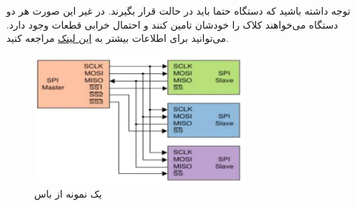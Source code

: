 توجه داشته باشید که دستگاه  حتما باید در حالت  قرار بگیرند. در غیر این صورت هر دو دستگاه می‌خواهند کلاک را خودشان تامین کنند و احتمال خرابی قطعات وجود دارد. می‌توانید برای اطلاعات بیشتر به
\href{https://circuitdigest.com/microcontroller-projects/arduino-spi-communication-tutorial}{این لینک}
مراجعه کنید.

\newline
\begin{figure}[h]
    \centering
    \includegraphics[width=8cm]{SPI_BUS.jpg}
    \caption{یک نمونه از باس }
    \label{fig:spibus}
\end{figure}
\newline